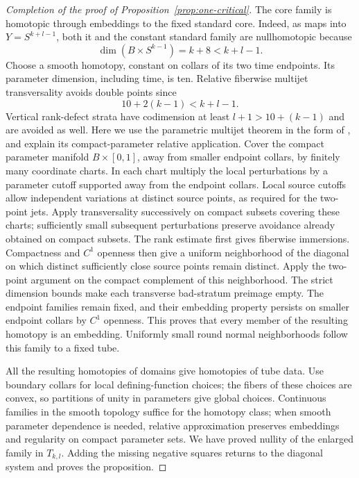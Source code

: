 \begin{proof}[Completion of the proof of Proposition~\ref{prop:one-critical}]
The core family is homotopic through embeddings to the fixed standard core. Indeed, as maps into $Y=S^{k+l-1}$, both it and the constant standard family are nullhomotopic because
\[
 \dim(B\times S^{k-1})=k+8<k+l-1.
\]
Choose a smooth homotopy, constant on collars of its two time endpoints. Its parameter dimension, including time, is ten. Relative fiberwise multijet transversality avoids double points since
\[
 10+2(k-1)<k+l-1.
\]
Vertical rank-defect strata have codimension at least $l+1>10+(k-1)$ and are avoided as well.
Here we use the parametric multijet theorem in the form of
\cite[Theorem~2.3.4 and Corollary~2.3.5(iii)]{BPT2025}, and explain
its compact-parameter relative application. Cover the compact parameter
manifold $B\times[0,1]$, away from smaller endpoint collars, by finitely
many coordinate charts. In each chart multiply the local perturbations
by a parameter cutoff supported away from the endpoint collars. Local
source cutoffs allow independent variations at distinct source points,
as required for the two-point jets. Apply transversality successively on
compact subsets covering these charts; sufficiently small subsequent
perturbations preserve avoidance already obtained on compact subsets.
The rank estimate first gives fiberwise immersions. Compactness and
$C^1$ openness then give a uniform neighborhood of the diagonal on
which distinct sufficiently close source points remain distinct.
Apply the two-point argument on the compact complement of this
neighborhood. The strict dimension bounds make each transverse
bad-stratum preimage empty. The endpoint families remain fixed, and
their embedding property persists on smaller endpoint collars by
$C^1$ openness. This proves that every member of the resulting homotopy
is an embedding. Uniformly small round normal neighborhoods follow this
family to a fixed tube.

All the resulting homotopies of domains give homotopies of tube data. Use boundary collars for local defining-function choices; the fibers of these choices are convex, so partitions of unity in parameters give global choices. Continuous families in the smooth topology suffice for the homotopy class; when smooth parameter dependence is needed, relative approximation preserves embeddings and regularity on compact parameter sets. We have proved nullity of the enlarged family in $T_{k,l}$. Adding the missing negative squares returns to the diagonal system and proves the proposition.
\end{proof}

